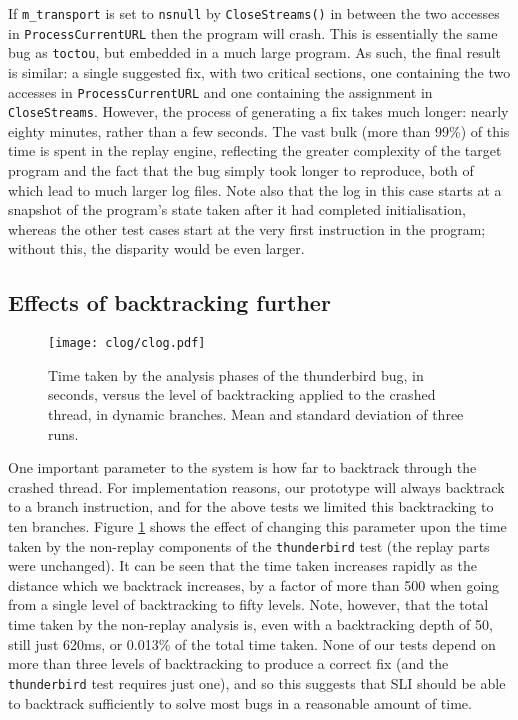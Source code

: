 \documentclass[10pt,twocolumn,preprint,natbib,authoryear]{sigplanconf}
\begin{document}
\noindent
If \verb|m_transport| is set to \verb|nsnull| by \verb|CloseStreams()|
in between the two accesses in \verb|ProcessCurrentURL| then the
program will crash.  This is essentially the same bug as
\verb|toctou|, but embedded in a much large program.  As such, the
final result is similar: a single suggested fix, with two critical
sections, one containing the two accesses in \verb|ProcessCurrentURL|
and one containing the assignment in \verb|CloseStreams|.  However,
the process of generating a fix takes much longer: nearly eighty
minutes, rather than a few seconds.  The vast bulk (more than 99\%) of
this time is spent in the replay engine, reflecting the greater
complexity of the target program and the fact that the bug simply took
longer to reproduce, both of which lead to much larger log files.
Note also that the log in this case starts at a snapshot of the
program's state taken after it had completed initialisation, whereas
the other test cases start at the very first instruction in the
program; without this, the disparity would be even larger.

\subsection{Effects of backtracking further}
\label{sect:eval:backtrack}

\begin{figure}
\texttt{[image: clog/clog.pdf]}
\caption{Time taken by the analysis phases of the thunderbird bug, in
  seconds, versus the level of backtracking applied to the crashed
  thread, in dynamic branches.  Mean and standard deviation of three
  runs.}
\label{fig:eval:backtrack}
\end{figure}

One important parameter to the system is how far to backtrack through
the crashed thread.  For implementation reasons, our prototype will
always backtrack to a branch instruction, and for the above tests we
limited this backtracking to ten branches.  Figure
\ref{fig:eval:backtrack} shows the effect of changing this parameter
upon the time taken by the non-replay components of the
\verb|thunderbird| test (the replay parts were unchanged).  It can be
seen that the time taken increases rapidly as the distance which we
backtrack increases, by a factor of more than 500 when going from a
single level of backtracking to fifty levels.  Note, however, that the
total time taken by the non-replay analysis is, even with a
backtracking depth of 50, still just 620ms, or 0.013\% of the total
time taken.  None of our tests depend on more than three levels of
backtracking to produce a correct fix (and the \verb|thunderbird| test
requires just one), and so this suggests that SLI should be able to
backtrack sufficiently to solve most bugs in a reasonable amount of
time.
\end{document}
